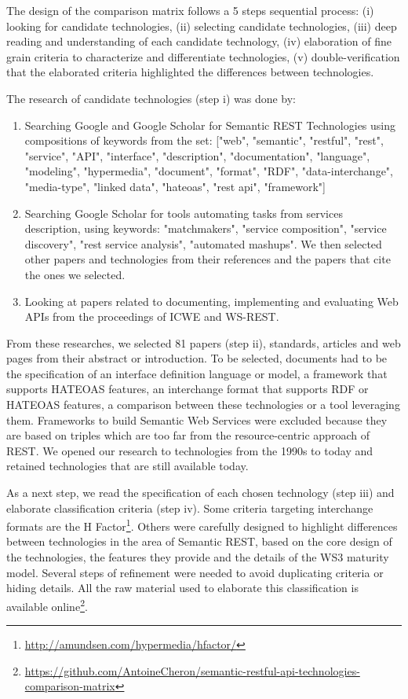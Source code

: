 The design of the comparison matrix follows a 5 steps sequential process: (i) looking for candidate technologies, (ii) selecting candidate technologies, (iii) deep reading and understanding of each candidate technology, (iv) elaboration of fine grain criteria to characterize and differentiate technologies, (v) double-verification that the elaborated criteria highlighted the differences between technologies.

The research of candidate technologies (step i) was done by:

\begin{enumerate}
    \item Searching Google and Google Scholar for Semantic REST Technologies using compositions of keywords from the set: ["web", "semantic", "restful", "rest", "service", "API", "interface", "description", "documentation", "language", "modeling", "hypermedia", "document", "format", "RDF", "data-interchange", "media-type", "linked data", "hateoas", "rest api", "framework"]
    \item Searching Google Scholar for tools automating tasks from services description, using keywords: "matchmakers", "service composition", "service discovery", "rest service analysis", "automated mashups". We then selected other papers and technologies from their references and the papers that cite the ones we selected.
    \item Looking at papers related to documenting, implementing and evaluating Web APIs from the proceedings of ICWE and WS-REST. 
\end{enumerate}

From these researches, we selected 81 papers (step ii), standards, articles and web pages from their abstract or introduction. To be selected, documents had to be the specification of an interface definition language or model, a framework that supports HATEOAS features, an interchange format that supports RDF or HATEOAS features, a comparison between these technologies or a tool leveraging them. Frameworks to build Semantic Web Services were excluded because they are based on triples which are too far from the resource-centric approach of REST. We opened our research to technologies from the 1990s to today and retained technologies that are still available today.

As a next step, we read the specification of each chosen technology (step iii) and elaborate classification criteria (step iv). Some criteria targeting interchange formats are the H Factor\footnote{\url{http://amundsen.com/hypermedia/hfactor/}}. Others were carefully designed to highlight differences between technologies in the area of Semantic REST, based on the core design of the technologies, the features they provide and the details of the WS3 maturity model. Several steps of refinement were needed to avoid duplicating criteria or hiding details. All the raw material used to elaborate this classification is available online\footnote{\url{https://github.com/AntoineCheron/semantic-restful-api-technologies-comparison-matrix}}. 

